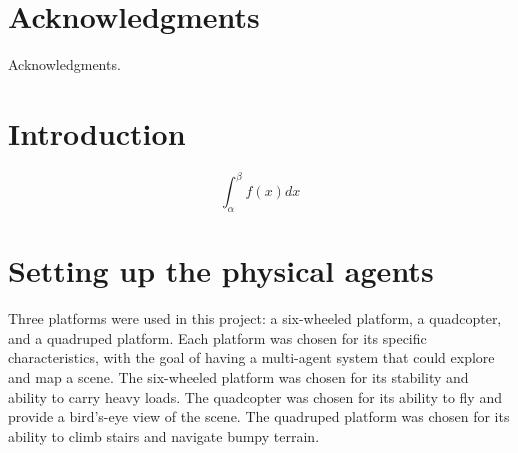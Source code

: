 \documentclass[11pt]{article}
\begin{document}
\newpage
\section*{Acknowledgments}

    Acknowledgments.
    
\newpage
\thispagestyle{empty}
\mbox{}
\newpage
\thispagestyle{empty}
{\small \tableofcontents}

\newpage
\thispagestyle{empty}
\mbox{}
\newpage

\section{Introduction}


    $$
    \int_\alpha^\beta f(x) dx
    $$
    \cite{xu2022fast}


\newpage

\section[Setting up the physical agents]{Setting up the physical agents}
\label{section:big title}%

        Three platforms were used in this project: a six-wheeled platform, a quadcopter, and a quadruped platform. Each platform was chosen for its specific characteristics, with the goal of having a multi-agent system that could explore and map a scene. The six-wheeled platform was chosen for its stability and ability to carry heavy loads. The quadcopter was chosen for its ability to fly and provide a bird's-eye view of the scene. The quadruped platform was chosen for its ability to climb stairs and navigate bumpy terrain.
\end{document}

